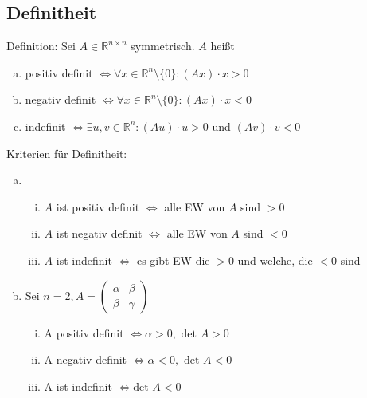 \subsection{Definitheit}

Definition: Sei $A \in \mathbb{R}^{n \times n}$ symmetrisch. $A$ heißt
\begin{enumerate} [a)]
    \item positiv definit $\Leftrightarrow \forall x \in \mathbb{R}^n \setminus \{0\}: (Ax) \cdot x > 0$
    \item negativ definit $ \Leftrightarrow \forall x \in \mathbb{R}^n \setminus \{0\}: (Ax) \cdot x < 0$
    \item indefinit $\Leftrightarrow \exists u,v \in \mathbb{R}^n: (Au) \cdot u > 0$ und $(Av) \cdot v < 0$
\end{enumerate}
\vspace{0.5cm}

Kriterien für Definitheit:
\begin{enumerate} [a)]
    \item \begin{enumerate} [i)]
        \item $A$ ist positiv definit $\Leftrightarrow$ alle EW von $A$ sind $> 0$
        \item $A$ ist negativ definit $\Leftrightarrow$ alle EW von $A$ sind $< 0$
        \item $A$ ist indefinit $\Leftrightarrow$ es gibt EW die $> 0$ und welche, die $< 0$ sind
    \end{enumerate}
    \item Sei $n=2, A = \begin{pmatrix} \alpha & \beta \\ \beta & \gamma\end{pmatrix}$
    \begin{enumerate} [i)]
        \item A positiv definit $\Leftrightarrow \alpha > 0, \text{ det } A > 0$
        \item A negativ definit $\Leftrightarrow \alpha < 0, \text{ det } A < 0$
        \item A ist indefinit $\Leftrightarrow \text{det } A < 0$
    \end{enumerate}
\end{enumerate}

